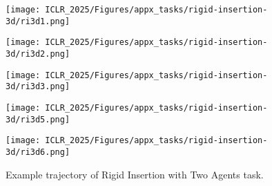\begin{figure*}[htb]
    \centering
    \begin{minipage}{0.19\textwidth}
            \centering
            \texttt{[image: ICLR\_2025/Figures/appx\_tasks/rigid-insertion-3d/ri3d1.png]}
    \end{minipage}
    \begin{minipage}{0.19\textwidth}
            \centering
            \texttt{[image: ICLR\_2025/Figures/appx\_tasks/rigid-insertion-3d/ri3d2.png]}
    \end{minipage}
    \begin{minipage}{0.19\textwidth}
            \centering
            \texttt{[image: ICLR\_2025/Figures/appx\_tasks/rigid-insertion-3d/ri3d3.png]}
    \end{minipage}
    \begin{minipage}{0.19\textwidth}
            \centering
            \texttt{[image: ICLR\_2025/Figures/appx\_tasks/rigid-insertion-3d/ri3d5.png]}
    \end{minipage}
    \begin{minipage}{0.19\textwidth}
            \centering
            \texttt{[image: ICLR\_2025/Figures/appx\_tasks/rigid-insertion-3d/ri3d6.png]}
    \end{minipage}

    \caption{
    Example trajectory of Rigid Insertion with Two Agents task.
    }
    \label{fig:appendix_ri3d_vis}
\end{figure*}